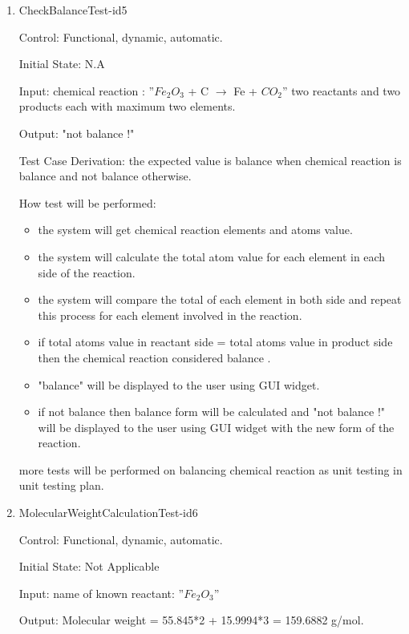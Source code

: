 \documentclass[12pt, titlepage]{article}
\begin{document}
\begin{enumerate}

\item{CheckBalanceTest-id5\\}

Control: Functional, dynamic, automatic.
					
Initial State: N.A
					
Input: 
\newline
chemical reaction : ”$Fe_2$$O_3$ + C $\rightarrow$ Fe + $CO_2$”
two reactants and two products each with maximum two elements.
	
Output: "not balance !"

Test Case Derivation: the expected value is balance when chemical reaction is balance and not balance otherwise. 

How test will be performed: 
\begin{itemize}
\item the system will get chemical reaction elements and atoms value. 
\item the system will calculate the total atom value for each element in each side of the reaction. 
\item the system will compare the total of each element in both side and repeat this process for each element involved in the reaction.
\item if total atoms value in reactant side = total atoms value in product side then the chemical reaction considered balance .
\item "balance" will be displayed to the user using GUI widget. 
\item if not balance then balance form will be calculated and "not balance !" will be displayed to the user using GUI widget with the new form of the reaction.
\end{itemize}

more tests will be performed on balancing chemical reaction as unit testing in unit testing plan. \cite{UnitVnVPlan}

\item{MolecularWeightCalculationTest-id6\\}

Control: Functional, dynamic, automatic.
					
Initial State: Not Applicable
					
Input: name of known reactant: ”$Fe_2$$O_3$”
				
Output:  Molecular weight = 55.845*2 + 15.9994*3 =  159.6882 g/mol. 


\end{enumerate}
\end{document}
